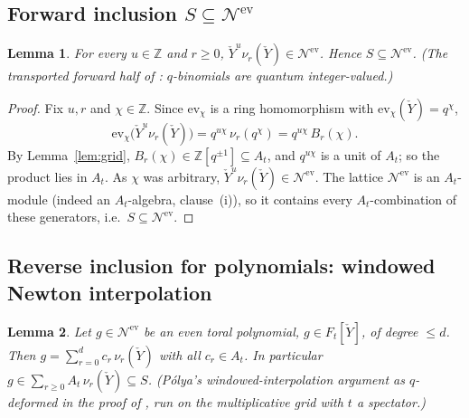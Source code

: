 \documentclass[11pt]{article}
\newtheorem{lemma}{Lemma}
\newcommand{\At}{A_t}
\newcommand{\Ft}{F_t}
\newcommand{\Nev}{\mathcal N^{\mathrm{ev}}}
\newcommand{\Yc}{\check Y}
\newcommand{\Z}{\mathbb Z}
\newcommand{\ev}{\mathrm{ev}}
\begin{document}
\subsection{Forward inclusion $S\subseteq\Nev$}

\begin{lemma}\label{lem:fwd}
For every $u\in\Z$ and $r\ge0$, $\Yc^{u}\nu_r(\Yc)\in\Nev$. Hence $S\subseteq\Nev$.
(The transported forward half of \cite[\S1]{HarmanHopkins}: $q$-binomials are
quantum integer-valued.)
\end{lemma}

\begin{proof}
Fix $u,r$ and $\chi\in\Z$. Since $\ev_\chi$ is a ring homomorphism with
$\ev_\chi(\Yc)=q^{\chi}$,
\[
  \ev_\chi\bigl(\Yc^{u}\nu_r(\Yc)\bigr)=q^{u\chi}\,\nu_r(q^{\chi})
  =q^{u\chi}\,B_r(\chi).
\]
By Lemma~\ref{lem:grid}, $B_r(\chi)\in\Z[q^{\pm1}]\subseteq\At$, and $q^{u\chi}$
is a unit of $\At$; so the product lies in $\At$. As $\chi$ was arbitrary,
$\Yc^{u}\nu_r(\Yc)\in\Nev$. The lattice $\Nev$ is an $\At$-module (indeed an
$\At$-algebra, clause~(i)), so it contains every $\At$-combination of these
generators, i.e.\ $S\subseteq\Nev$.
\end{proof}

\subsection{Reverse inclusion for polynomials: windowed Newton interpolation}

\begin{lemma}\label{lem:rev}
Let $g\in\Nev$ be an even toral \emph{polynomial}, $g\in\Ft[\Yc]$, of degree
$\le d$. Then $g=\sum_{r=0}^{d}c_r\,\nu_r(\Yc)$ with all $c_r\in\At$. In
particular $g\in\sum_{r\ge0}\At\,\nu_r(\Yc)\subseteq S$.
(P\'olya's windowed-interpolation argument as $q$-deformed in the proof of
\cite[\S1]{HarmanHopkins}, run on the multiplicative grid with $t$ a
spectator.)
\end{lemma}
\end{document}
